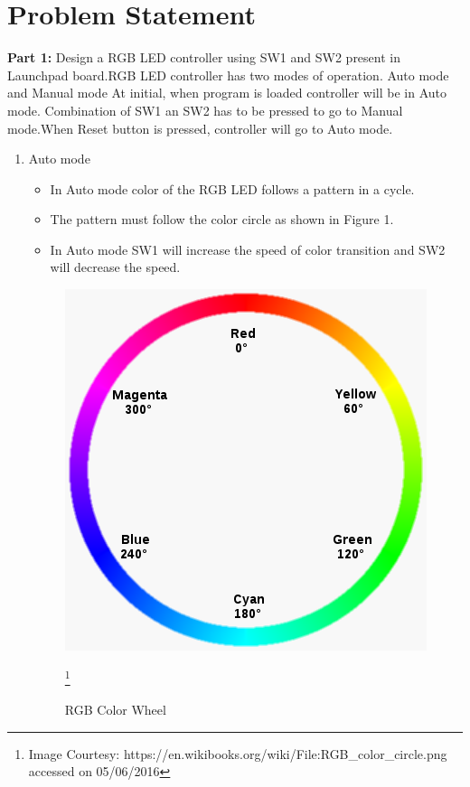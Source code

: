 \documentclass[a4paper,12pt,oneside]{book}
\begin{document}
\section{Problem Statement}
\textbf{Part 1:} 
Design a RGB LED controller using SW1 and SW2 present in Launchpad board.RGB LED controller has two modes of operation. Auto mode and Manual mode
At initial, when program is loaded controller will be in Auto mode. Combination of SW1 an SW2 has to be pressed to go to Manual mode.When Reset button is pressed, controller will go to Auto mode.
\begin{enumerate}
\item Auto mode
\begin{itemize}
  \item In Auto mode color of the RGB LED follows a pattern in a cycle.
  \item The pattern must follow the color circle as shown in Figure 1.
  \item In Auto mode SW1 will increase the speed of color transition and SW2 will decrease the speed.
\end{itemize}
\begin{figure}
\centerline{\includegraphics[scale=0.8]{RGB_color_circle.png}}
\footnote{Image Courtesy: https://en.wikibooks.org/wiki/File:RGB\_color\_circle.png accessed on 05/06/2016}
\caption{RGB Color Wheel}
\end{figure}


\end{enumerate}
\end{document}
